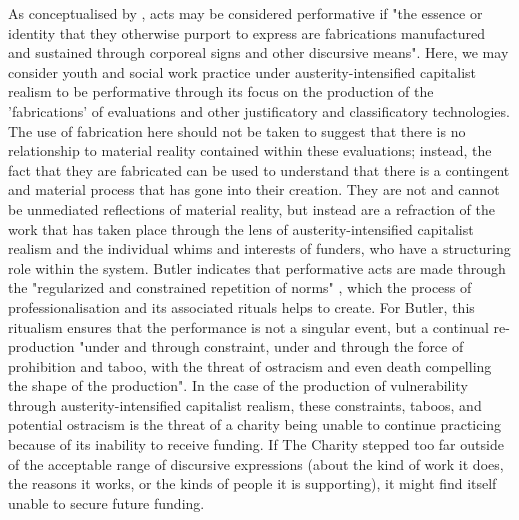 As conceptualised by \citet[173]{butler_gender_2011}, acts may be considered performative if "the essence or identity that they otherwise purport to express are fabrications manufactured and sustained through corporeal signs and other discursive means". Here, we may consider youth and social work practice under austerity-intensified capitalist realism to be performative through its focus on the production of the 'fabrications' of evaluations and other justificatory and classificatory technologies. The use of fabrication here should not be taken to suggest that there is no relationship to material reality contained within these evaluations; instead, the fact that they are fabricated can be used to understand that there is a contingent and material process that has gone into their creation. They are not and cannot be unmediated reflections of material reality, but instead are a refraction of the work that has taken place through the lens of austerity-intensified capitalist realism and the individual whims and interests of funders, who have a structuring role within the system. Butler indicates that performative acts are made through the "regularized and constrained repetition of norms" \citep[95]{butler_bodies_2014}, which the process of professionalisation and its associated rituals helps to create. For Butler, this ritualism ensures that the performance is not a singular event, but a continual re-production "under and through constraint, under and through the force of prohibition and taboo, with the threat of ostracism and even death compelling the shape of the production". In the case of the production of vulnerability through austerity-intensified capitalist realism, these constraints, taboos, and potential ostracism is the threat of a charity being unable to continue practicing because of its inability to receive funding. If The Charity stepped too far outside of the acceptable range of discursive expressions (about the kind of work it does, the reasons it works, or the kinds of people it is supporting), it might find itself unable to secure future funding. 

